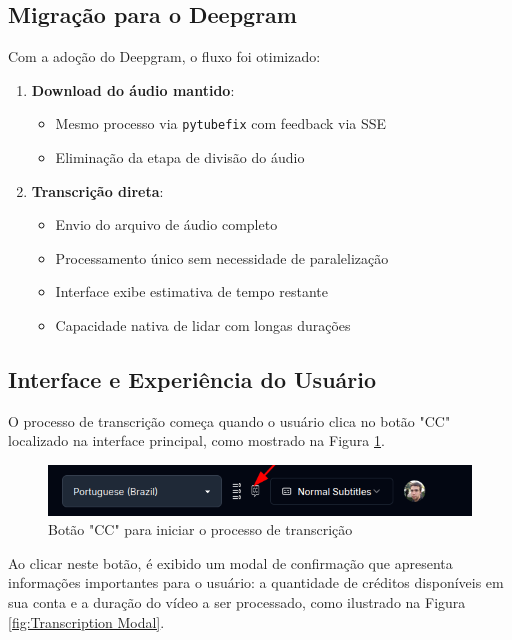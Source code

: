 \documentclass[tcc,capa]{texufpel}
\begin{document}
\subsection{Migração para o Deepgram}

Com a adoção do Deepgram, o fluxo foi otimizado:

\begin{enumerate}
    \item \textbf{Download do áudio mantido}:
    \begin{itemize}
        \item Mesmo processo via \texttt{pytubefix} com feedback via SSE
        \item Eliminação da etapa de divisão do áudio
    \end{itemize}

    \item \textbf{Transcrição direta}:
    \begin{itemize}
        \item Envio do arquivo de áudio completo
        \item Processamento único sem necessidade de paralelização
        \item Interface exibe estimativa de tempo restante
        \item Capacidade nativa de lidar com longas durações
    \end{itemize}
\end{enumerate}

\subsection{Interface e Experiência do Usuário}

O processo de transcrição começa quando o usuário clica no botão "CC" localizado na interface principal, como mostrado na Figura \ref{fig:cc_button}.

\begin{figure}[H]
  \centering
  \includegraphics[width=\textwidth,height=0.45\textheight,keepaspectratio]{exemplo-slides/graphics/images/CC.png}
  \caption{Botão "CC" para iniciar o processo de transcrição}
  \label{fig:cc_button}
\end{figure}

Ao clicar neste botão, é exibido um modal de confirmação que apresenta informações importantes para o usuário: a quantidade de créditos disponíveis em sua conta e a duração do vídeo a ser processado, como ilustrado na Figura \ref{fig:Transcription Modal}.
\end{document}
